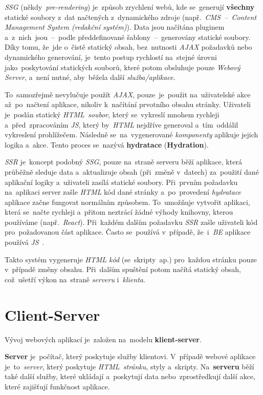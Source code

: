 \documentclass[11pt,a4paper]{report}
\let\oldacrshort\acrshort
\renewcommand{\acrshort}[1]{\emph{\normalsize\color[rgb]{0,0,0}\noindent\oldacrshort{#1}}}
\begin{document}
            \acrshort{SSG} (někdy~\emph{pre-rendering}) je~způsob zrychlení webů, kde se~generují \textbf{všechny} statické soubory z~dat načtených z~dynamického zdroje (např.~\emph{CMS~--~Content Management System (redakční systém)}). Data jsou načítána pluginem a~z~nich~jsou~--~podle předdefinované šablony~--~generovány statické soubory. Díky tomu, že~jde o~čistě statický obsah, bez~nutnosti \acrshort{AJAX} požadavků nebo dynamického generování, je~tento postup rychlostí na~stejné úrovni jako~poskytování statických souborů, které potom obsluhuje pouze \emph{Webový Server}, a~není nutné, aby~běžela další \emph{služba/aplikace}.
            
            To~samozřejmě nevylučuje použít \acrshort{AJAX}, pouze~je~použit na~uživatelské akce až~po~načtení aplikace, nikoliv k~načítání prvotního obsahu stránky. Uživateli je~poslán statický \emph{HTML~soubor}, který se~vykreslí mnohem rychleji a~před~zpracováním \acrshort{JS}, který by~\acrshort{HTML} nejdříve generoval a~tím~oddálil vykreslení prohlížečem. Následně se~na~vygenerované \emph{komponenty} aplikuje jejich logika a~akce. Tento proces se~nazývá \textbf{hydratace} (\textbf{Hydration}).

            \acrshort{SSR} je~koncept podobný \acrshort{SSG}, pouze na~straně serveru běží aplikace, která průběžně sleduje data a~aktualizuje obsah (při~změně v~datech) za~použití dané aplikační logiky a~uživateli zasílá statické soubory. Při~prvním požadavku na~aplikaci server zašle \acrshort{HTML} kód dané stránky a~po~provedení \emph{hydratace} aplikace začne fungovat normálním způsobem. To~umožňuje vytvořit aplikaci, která se~načte rychleji a~přitom neztrácí žádné výhody knihovny, kterou používáme (např.~\emph{React}). Při~každém dalším požadavku \emph{SSR} zašle uživateli kód pro~požadovanou část aplikace. Často se~používá v~případě, že~i~\acrshort{BE} aplikace používá \acrshort{JS}~\cite{uc:ssrandssg}.

            Takto systém vygeneruje \emph{HTML kód} (se~skripty~ap.) pro~každou stránku pouze v~případě změny obsahu. Při~dalším spuštění potom načítá statický obsah, což~ušetří výkon na~straně \emph{serveru} i~\emph{klienta}.

        \section{Client-Server}
            Vývoj webových aplikací je~založen na~modelu \textbf{klient-server}.

            \textbf{Server} je~počítač, který poskytuje služby klientovi. V~případě webové aplikace je~to~\emph{server}, který poskytuje \emph{HTML~stránku}, styly a~skripty. Na~\textbf{serveru} běží také další služby, které ukládají a~poskytují data nebo~zprostředkují další akce, které zajišťují funkčnost aplikace.
\end{document}
